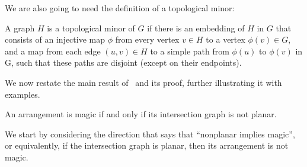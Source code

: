 \documentclass{llncs}
\begin{document}
We are also going to need the definition of a topological minor:

\begin{definition}\label{def:topo}
  A graph \(H\) is a topological minor of \(G\) if there is an
  embedding of \(H\) in \(G\) that consists of an injective map
  \(\phi\) from every vertex \(v \in H\) to a vertex
  \(\phi(v) \in G\), and a map from each edge \((u, v) \in H\) to a
  simple path from \(\phi(u)\) to \(\phi(v)\) in G, such that these
  paths are disjoint (except on their endpoints).
\end{definition}

We now restate the main result of~\cite{arkhipov:2012} and its proof,
further illustrating it with examples.

\begin{theorem}\label{theo:main}
  An arrangement is magic if and only if its intersection graph is not
  planar.
\end{theorem}

We start by considering the direction that says that ``nonplanar
implies magic'', or equivalently, if the intersection graph is planar,
then its arrangement is not magic.
\end{document}
